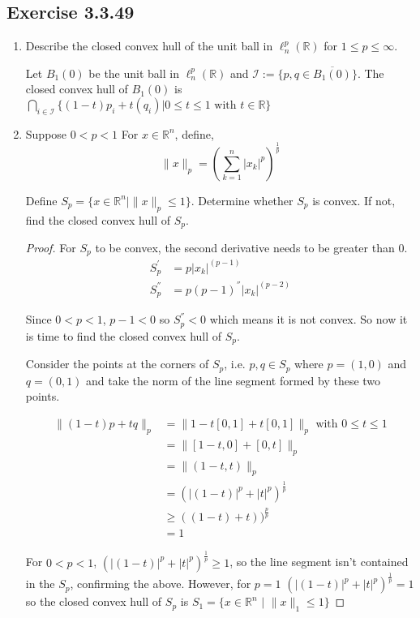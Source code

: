 \documentclass{tufte-book}
\theoremstyle{mytheoremstyle}
\theoremstyle{mylemstyle}
\theoremstyle{mydefstyle}
\begin{document}
\subsection{Exercise 3.3.49}
\begin{enumerate}
\item Describe the closed convex hull of the unit ball in $\ell_n^p(\mathbb{R})$ for $1 \leq p \leq \infty$.

Let $B_1(0)$ be the unit ball in $\ell_n^p(\mathbb{R})$ and $\mathcal{I} := \{p,q \in \overline{B_1(0)} \}$.  The closed convex hull of $B_1(0)$ is $\bigcap_{i \in \mathcal{I}} \{(1-t)p_i + t(q_i) | 0 \leq t \leq 1 \text{ with } t \in \mathbb{R} \}$ 

\item Suppose $0 < p < 1$ For $x \in \mathbb{R}^n$, define,
\[ \|x\|_p = \left( \sum_{k=1}^n |x_k|^p \right)^\frac{1}{p} \]

Define $S_p = \{x \in \mathbb{R}^n | \|x\|_p \leq 1 \}$.  Determine whether $S_p$ is convex.  If not, find the closed convex hull of $S_p$.

\begin{proof}

For $S_p$ to be convex, the second derivative needs to be greater than $0$.
\begin{align*}
S_p^{'} &= p|x_k|^{(p-1)}\\
S_p^{''} &= p(p-1)^{''}|x_k|^{(p-2)}
\end{align*}

Since $0< p < 1$, $p-1 < 0$ so $S_p^{''} < 0$ which means it is not convex.  So now it is time to find the closed convex hull of $S_p$.

Consider the points at the corners of $S_p$, i.e. $p,q \in S_p$ where $p=(1,0)$ and $q=(0,1)$ and take the norm of the line segment formed by these two points.

\begin{align*}
\|(1-t)p+tq\|_p &= \|1-t[0,1] + t[0,1]\|_p \text{ with } 0 \leq t \leq 1 \\
&= \|[1-t,0] + [0,t]\|_p\\
&= \|(1-t, t)\|_p \\
&= (|(1-t)|^p + |t|^p)^\frac{1}{p} \\
&\geq ((1-t) + t))^\frac{p}{p} \\
&= 1
\end{align*}

For $0<p<1$, $(|(1-t)|^p + |t|^p)^\frac{1}{p} \geq 1$, so the line segment isn't contained in the $S_p$, confirming the above.  However, for $p=1$ $(|(1-t)|^p + |t|^p)^\frac{1}{p} = 1$ so the closed convex hull of $S_p$ is $S_1 = \{x \in \mathbb{R}^n \text{ | } \|x\|_1 \leq 1 \}$

\end{proof}

\end{enumerate}
\end{document}
